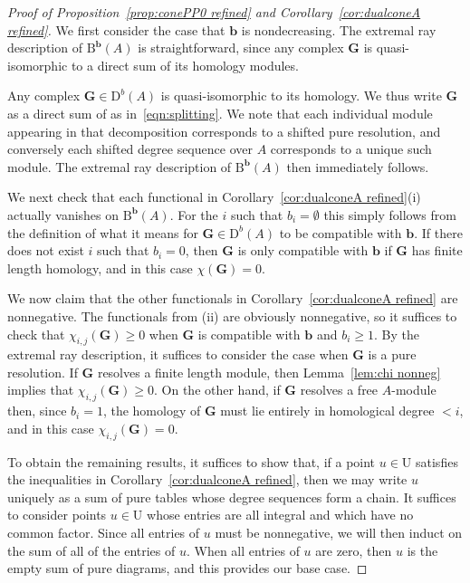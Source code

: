 \documentclass[12pt]{amsart}
\theoremstyle{definition}
\theoremstyle{remark}
\newcommand{\UU}{\mathrm{U}}
\newcommand{\bb}{\mathbf{b}}
\newcommand{\Gbull}{\mathbf{G}}
\newcommand{\DD}{\mathrm{D}}
\newcommand{\BBQ}{\mathrm{B}}
\begin{document}
\begin{proof}[Proof of Proposition~\ref{prop:conePP0 refined} and Corollary~\ref{cor:dualconeA refined}]
We first consider the case that $\bb$ is nondecreasing.  The extremal ray description of $\BBQ^{\bb}(A)$ is straightforward, since any complex $\Gbull$ is quasi-isomorphic to a direct sum of its homology modules.  

Any complex $\Gbull\in \DD^b(A)$ is quasi-isomorphic to its homology.  We thus write $\Gbull$ as a direct sum of as in~\eqref{eqn:splitting}.  We note that each individual module appearing in that decomposition corresponds to a shifted pure resolution, and conversely each shifted degree sequence over $A$ corresponds to a unique such module.  The extremal ray description of $\BBQ^{\bb}(A)$ then immediately follows.

We next check that each functional in Corollary~\ref{cor:dualconeA refined}(i) actually vanishes on $\BBQ^{\bb}(A)$.  For the $i$ such that $b_i=\emptyset$ this simply follows from the definition of what it means for $\Gbull\in \DD^b(A)$ to be compatible with $\bb$.  If there does not exist $i$ such that $b_i=0$, then $\Gbull$ is only compatible with $\bb$ if $\Gbull$ has finite length homology, and in this case $\chi(\Gbull)=0$.  

We now claim that the other functionals in Corollary~\ref{cor:dualconeA refined} are nonnegative.  The functionals from (ii) are obviously nonnegative, so it suffices to check that $\chi_{i,j}(\Gbull)\geq 0$ when $\Gbull$ is compatible with $\bb$ and $b_i\geq 1$.  By the extremal ray description, it suffices to consider the case when $\Gbull$ is a pure resolution.  If $\Gbull$ resolves a finite length module, then Lemma~\ref{lem:chi nonneg} implies that $\chi_{i,j}(\Gbull)\geq 0$.  On the other hand, if $\Gbull$ resolves a free $A$-module then, since $b_i=1$, the homology of $\Gbull$ must lie entirely in homological degree $<i$, and in this case $\chi_{i,j}(\Gbull)=0$.

To obtain the remaining results, it suffices to show that, if a point $u\in \UU$ satisfies the inequalities in Corollary~\ref{cor:dualconeA refined}, then we may write $u$ uniquely as a sum of pure tables whose degree sequences form a chain.  It suffices to consider points $u\in \UU$ whose entries are all integral and which have no common factor.  Since all entries of $u$ must be nonnegative, we will then induct on the sum of all of the entries of $u$.  When all entries of $u$ are zero, then $u$ is the empty sum of pure diagrams, and this provides our base case.


\end{proof}
\end{document}
